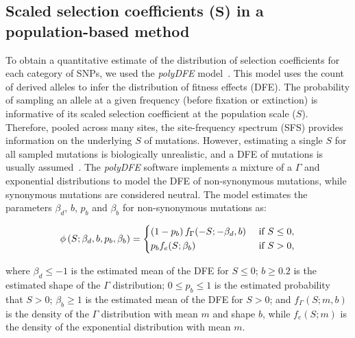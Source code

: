\documentclass[10pt,letterpaper]{article}
\newcommand{\Spop}{S}
\newcommand{\AdvMean}{\beta_b}
\newcommand{\DelMean}{\beta_d}
\begin{document}
\subsection{Scaled selection coefficients (\texorpdfstring{$\bm{\Spop}$}{S}) in a population-based method}
\label{subsec:s-polymorphism-method}

To obtain a quantitative estimate of the distribution of selection coefficients for each category of SNPs, we used the \textit{polyDFE} model~\cite{tataru_inference_2017, tataru_polydfe_2020}.
This model uses the count of derived alleles to infer the distribution of fitness effects (DFE).
The probability of sampling an allele at a given frequency (before fixation or extinction) is informative of its scaled selection coefficient at the population scale ($\Spop$).
Therefore, pooled across many sites, the site-frequency spectrum (SFS) provides information on the underlying $\Spop$ of mutations.
However, estimating a single $\Spop$ for all sampled mutations is biologically unrealistic, and a DFE of mutations is usually assumed~\cite{eyre-walker_distribution_2006, eyre-walker_estimating_2009}.
The \textit{polyDFE}\cite{tataru_inference_2017, tataru_polydfe_2020} software implements a mixture of a $\Gamma$ and exponential distributions to model the DFE of non-synonymous mutations, while synonymous mutations are considered neutral.
The model estimates the parameters $\DelMean$, $b$, $p_b$ and $\AdvMean$ for non-synonymous mutations as:

\begin{equation}
\label{eq:parametric-dfe}
\phi \left( \Spop; \DelMean , b, p_b, \AdvMean \right) =
\begin{dcases}
\left( 1 - p_b \right) f_{\Gamma}(-\Spop; -\DelMean, b) & \text{ if $\Spop \leq 0$,} \\
p_b f_{e}(\Spop; \AdvMean) & \text{ if $\Spop > 0$,} \\
\end{dcases}
\end{equation}

where $\DelMean \leq -1 $ is the estimated mean of the DFE for $\Spop \leq 0$;
$b \geq 0.2$ is the estimated shape of the $\Gamma$ distribution;
$0 \leq p_b \leq 1$ is the estimated probability that $\Spop > 0$;
$\AdvMean \geq 1$ is the estimated mean of the DFE for $\Spop > 0$;
and $f_{\Gamma}(\Spop; m, b)$ is the density of the $\Gamma$ distribution with mean $m$ and shape $b$, while $f_{e}(\Spop; m)$ is the density of the exponential distribution with mean $m$.
\end{document}
